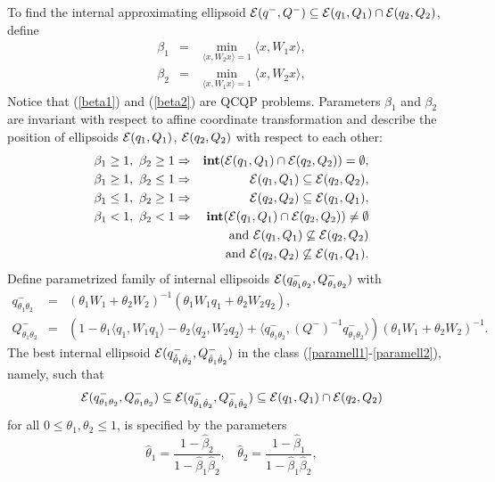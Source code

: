 \documentclass{report}
\newcommand{\EE}{{\cal E}}
\begin{document}
To find the internal approximating ellipsoid
$\EE(q^-,Q^-)\subseteq\EE(q_1,Q_1)\cap\EE(q_2,Q_2)$, define
\begin{eqnarray}
\beta_1 & = &
\min_{\langle x,W_2x\rangle=1}\langle x,W_1x\rangle, \label{beta1}\\
\beta_2 & = & \min_{\langle x,W_1x\rangle=1}\langle x,W_2x\rangle, \label{beta2}
\end{eqnarray}
Notice that (\ref{beta1}) and (\ref{beta2}) are QCQP problems.
Parameters $\beta_1$ and $\beta_2$ are invariant with respect to affine
coordinate transformation and describe the position of ellipsoids
$\EE(q_1,Q_1)$, $\EE(q_2,Q_2)$ with respect to each other:
\begin{eqnarray*}
\beta_1\geq1,~\beta_2\geq1 & \Rightarrow &
{\bf int}(\EE(q_1,Q_1)\cap\EE(q_2,Q_2))=\emptyset, \\
\beta_1\geq1,~\beta_2\leq1 & \Rightarrow & \EE(q_1,Q_1)\subseteq\EE(q_2,Q_2), \\
\beta_1\leq1,~\beta_2\geq1 & \Rightarrow & \EE(q_2,Q_2)\subseteq\EE(q_1,Q_1), \\
\beta_1<1,~\beta_2<1 & \Rightarrow &
{\bf int}(\EE(q_1,Q_1)\cap\EE(q_2,Q_2))\neq\emptyset \\
& & \mbox{and} ~ \EE(q_1,Q_1)\not\subseteq\EE(q_2,Q_2) \\
& & \mbox{and} ~ \EE(q_2,Q_2)\not\subseteq\EE(q_1,Q_1).
\end{eqnarray*}
Define parametrized family of internal ellipsoids
$\EE(q^-_{\theta_1\theta_2},Q^-_{\theta_1\theta_2})$ with
\begin{eqnarray}
q^-_{\theta_1\theta_2} & = & (\theta_1W_1 +
\theta_2W_2)^{-1}(\theta_1W_1q_1 + \theta_2W_2q_2), \label{paramell1} \\
Q^-_{\theta_1\theta_2} & = & (1 - \theta_1\langle q_1,W_1q_1\rangle -
\theta_2\langle q_2,W_2q_2\rangle +
\langle q^-_{\theta_1\theta_2},(Q^-)^{-1}q^-_{\theta_1\theta_2}\rangle)
(\theta_1W_1 + \theta_2W_2)^{-1} .\label{paramell2}
\end{eqnarray}
The best internal ellipsoid
$\EE(q^-_{\hat{\theta}_1\hat{\theta}_2},Q^-_{\hat{\theta}_1\hat{\theta}_2})$
in the class (\ref{paramell1}-\ref{paramell2}), namely, such that
\[ \EE(q^-_{{\theta}_1{\theta}_2},Q^-_{{\theta}_1{\theta}_2})\subseteq
\EE(q^-_{\hat{\theta}_1\hat{\theta}_2},Q^-_{\hat{\theta}_1\hat{\theta}_2})
\subseteq \EE(q_1,Q_1)\cap\EE(q_2,Q_2) \]
for all $0\leq\theta_1,\theta_2\leq1$, is specified by the parameters
\begin{equation}
\hat{\theta}_1 = \frac{1-\hat{\beta}_2}{1-\hat{\beta}_1\hat{\beta}_2}, ~~~~
\hat{\theta}_2 = \frac{1-\hat{\beta}_1}{1-\hat{\beta}_1\hat{\beta}_2},
\label{thetapar}
\end{equation}
\end{document}

